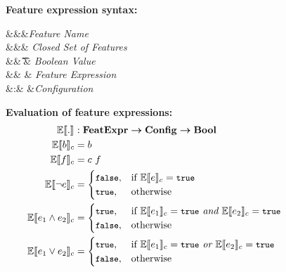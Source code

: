 \begin{figure}
%
\textbf{Feature expression syntax:}
\begin{syntax}
\synDef \fName \fSet &&&\textit{Feature Name}\\
\synDef \features {\settype \fSet} &&& \textit{Closed Set of Features}\\
\synDef \bTag \bSet &\eqq& \t \myOR \f & \textit{Boolean Value}\\
\synDef \dimMeta \ffSet &\eqq& \bTag \myOR \fName \myOR \neg \dimMeta \myOR \dimMeta \wedge \dimMeta \myOR \dimMeta \vee \dimMeta & \textit{Feature Expression}\\
\synDef \config \confSet &:& \fSet \totype \bSet &\textit{Configuration}
\end{syntax}

\medskip
\textbf{Evaluation of feature expressions:}
\begin{alignat*}{1}
\fSem [] . &: \ffSet \totype \confSet \totype \bSet\\
\fSem \bTag &= \bTag\\
\fSem \fName &= \config \ \fName\\
\fSem {\neg \dimMeta} &= 
	\begin{cases}
	  \f, &\If \fSem \dimMeta = \t\\
	  \t, &\Otherwise
	\end{cases}\\
\fSem {\annd \dimMeta} &= 
	\begin{cases}
	  \t, &\If \fSem {\dimMeta_1} = \t \textit{ and } \fSem {\dimMeta_2} = \t\\
	  \f, &\Otherwise
	\end{cases}\\
\fSem {\orr \dimMeta} &= 
	\begin{cases}
	  \t, &\If \fSem {\dimMeta_1} = \t \textit{ or } \fSem {\dimMeta_2} = \t\\
	  \f, &\Otherwise
	\end{cases}
\end{alignat*}


\end{figure}
